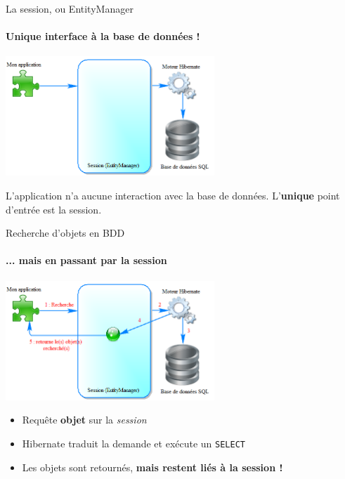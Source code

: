 \documentclass[compress]{beamer}%
\begin{document}
\begin{frame}{La session, ou EntityManager}
	\framesubtitle{Unique interface à la base de données !}
	
	\begin{center}
	\includegraphics[height=4.5cm]{images/with_orm_empty.png}	
	\end{center}
	
	\begin{block}{}
	\center
	L'application n'a aucune interaction avec la base de données. L'\textbf{unique} point d'entrée est la session.
	\end{block}
\end{frame}

\begin{frame}{Recherche d'objets en BDD}
	\framesubtitle{... mais en passant par la session}
	
	\begin{center}
	\includegraphics[height=4.5cm]{images/with_orm_select.png}	
	\end{center}
	
	\begin{itemize}
	\item Requête \textbf{objet} sur la \emph{session}
	\item Hibernate traduit la demande et exécute un \texttt{SELECT}
	\item Les objets sont retournés, \textbf{mais restent liés à la session !}
	\end{itemize}
	
\end{frame}
\end{document}
